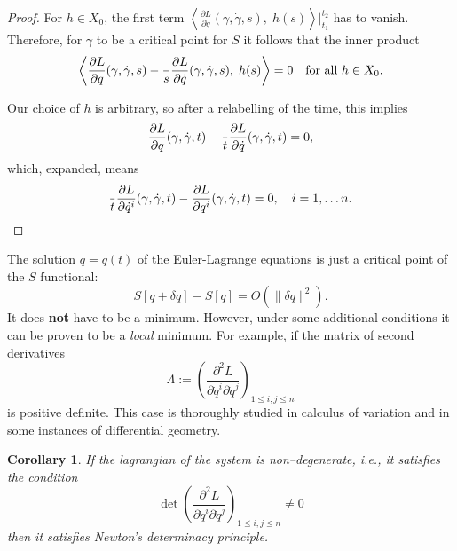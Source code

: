 \documentclass[english,fontsize=11pt,paper=a5,oneside]{scrbook}
\newcommand{\lag}{\langle}
\newcommand{\rag}{\rangle}
\let\d\relax
\newcommand{\d}{\mathrm{d}}
\newtheorem{corollary}[theorem]{Corollary}
\theoremstyle{definition}
\newenvironment{remark}
  {\pushQED{\qed}\renewcommand{\qedsymbol}{$\lozenge$}\remarkx}
  {\popQED\endremarkx}
\begin{document}
\begin{proof}
  For $h\in X_0$, the first term $\left\lag\frac{\partial L}{\partial \dot q}(\gamma, \dot \gamma, s),\; h(s)\right\rag\Big|_{t_1}^{t_2}$ has to vanish. Therefore, for $\gamma$ to be a critical point for $S$ it follows that the inner product
  \begin{equation}
    \left\lag
    \frac{\partial L}{\partial q}(\gamma, \dot \gamma, s)
    - \frac{\d}{\d s}\frac{\partial L}{\partial \dot q}(\gamma, \dot \gamma, s)
    ,\; h(s)\right\rag = 0 \quad\mbox{for all } h\in X_0.
  \end{equation}

  Our choice of $h$ is arbitrary, so after a relabelling of the time, this implies
  \begin{equation}
    \frac{\partial L}{\partial q}(\gamma, \dot \gamma, t)
    - \frac{\d}{\d t}\frac{\partial L}{\partial \dot q}(\gamma, \dot \gamma, t) = 0,
  \end{equation}
  which, expanded, means
  \begin{equation}
    \frac{\d}{\d t}\frac{\partial L}{\partial \dot q^i}(\gamma, \dot \gamma, t) - \frac{\partial L}{\partial q^i}(\gamma, \dot \gamma, t) = 0, \quad i=1,\ldots n.
  \end{equation}
\end{proof}

\begin{remark}
  The solution $q=q(t)$ of the Euler-Lagrange equations is just a critical point of the $S$ functional:
  \begin{equation}
    S[q + \delta q] - S[q] = O(\|\delta q\|^2).
  \end{equation}
  It does \textbf{not} have to be a minimum. However, under some additional conditions it can be proven to be a \emph{local} minimum.
  For example, if the matrix of second derivatives
  \begin{equation}\label{eq:hsd}
    \Lambda := \left(
    \frac{\partial^2 L}{\partial\dot q^i \partial\dot q^j}
    \right)_{1\leq i,j\leq n}
  \end{equation}
  is positive definite.
  This case is thoroughly studied in calculus of variation and in some instances of differential geometry.
\end{remark}

\begin{corollary}
  If the lagrangian of the system is \emph{non--degenerate}, i.e., it satisfies the condition
  \begin{equation}
    \det \left(\frac{\partial^2 L}{\partial\dot q^i \partial\dot q^j}
    \right)_{1\leq i,j\leq n} \neq 0
  \end{equation}
  then it satisfies Newton's determinacy principle.
\end{corollary}
\end{document}

